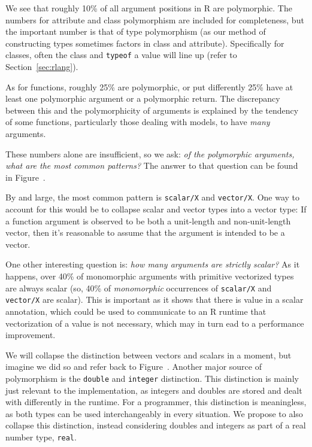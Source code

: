 \documentclass[acmsmall,10pt,review,anonymous]{acmart}\settopmatter{printfolios=true,printccs=false,printacmref=false}
\newcommand{\code}[1]{\lstinline|#1|\xspace}
\begin{document}

We see that roughly 10\% of all argument positions in R are polymorphic.
The numbers for attribute and class polymorphism are included for completeness, but the important number is that of type polymorphism (as our method of constructing types sometimes factors in class and attribute).
Specifically for classes, often the class and \code{typeof} a value will line up (refer to Section~\ref{sec:rlang}).

As for functions, roughly 25\% are polymorphic, or put differently 25\% have at least one polymorphic argument or a polymorphic return.
The discrepancy between this and the polymorphicity of arguments is explained by the tendency of some functions, particularly those dealing with models, to have {\it many} arguments.

These numbers alone are insufficient, so we ask: {\it of the polymorphic arguments, what are the most common patterns?}
The answer to that question can be found in Figure~.

By and large, the most common pattern is {\tt scalar/X} and {\tt vector/X}.
One way to account for this would be to collapse scalar and vector types into a vector type:
If a function argument is observed to be both a unit-length and non-unit-length vector, then it's reasonable to assume that the argument is intended to be a vector.

One other interesting question is: {\it how many arguments are strictly scalar?}
As it happens, over 40\% of monomorphic arguments with primitive vectorized types are always scalar (so, 40\% of {\it monomorphic} occurrences of {\tt scalar/X} and {\tt vector/X} are scalar).
This is important as it shows that there is value in a scalar annotation, which could be used to communicate to an R runtime that vectorization of a value is not necessary, which may in turn ead to a performance improvement.

We will collapse the distinction between vectors and scalars in a moment, but imagine we did so and refer back to Figure~.
Another major source of polymorphism is the {\tt double} and {\tt integer} distinction.
This distinction is mainly just relevant to the implementation, as integers and doubles are stored and dealt with differently in the runtime.
For a programmer, this distinction is meaningless, as both types can be used interchangeably in every situation.
We propose to also collapse this distinction, instead considering doubles and integers as part of a real number type, {\tt real}.
\end{document}
